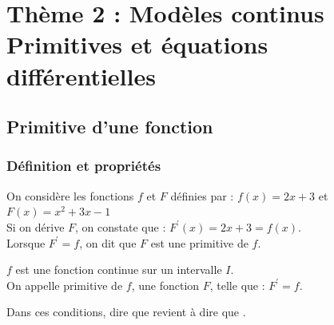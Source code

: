 \chapter[Thème 2 $-$ Primitives et équa diff]{Thème 2 : Modèles continus \\Primitives et équations différentielles}
\thispagestyle{fancy}

\vspace*{-0.6cm}
\section{Primitive d'une fonction}
\subsection{Définition et propriétés}

\begin{bexemple}
	On considère les fonctions $f$ et $F$ définies par : $f(x)=2 x+3$ et $F(x)=x^{2}+3 x-1$\\
	Si on dérive $F$, on constate que : $F^{\prime}(x)=2 x+3=f(x)$.\\
	Lorsque $F^{\prime}=f$, on dit que $F$ est une primitive de $f$.
\end{bexemple}

\begin{bdefi}
	$f$ est une fonction continue sur un intervalle $I$.\\
	On appelle primitive de $f$, une fonction $F$, telle que : $F^{\prime}=f$.
\end{bdefi}	

\begin{brmq}
	Dans ces conditions, dire que  revient à dire que  .
\end{brmq}

